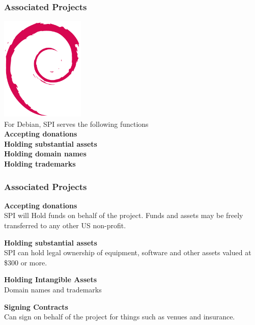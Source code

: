 \documentclass[10pt, compress]{beamer}
\begin{document}
\begin{frame}[fragile]
  \frametitle{Associated Projects}
  \begin{center}
    \includegraphics[width=0.3\textwidth]{images/debian.png}
    \\ \vspace{4mm}
    For Debian, SPI serves the following functions
    \\ \vspace{4mm}
    \textbf{Accepting donations}
    \\
    \textbf{Holding substantial assets}
    \\
    \textbf{Holding domain names}
    \\
    \textbf{Holding trademarks}
    \end{center}
\end{frame}


\begin{frame}[fragile]
  \frametitle{Associated Projects}
    \textbf{Accepting donations}\\
    SPI will Hold funds on behalf of the project. Funds and assets may be freely transferred to any other US non-profit.
    
    \vspace{4mm}
    
    \textbf{Holding substantial assets}\\
    SPI can hold legal ownership of equipment, software and other assets valued at \$300 or more.
    
    \vspace{4mm}
    
    \textbf{Holding Intangible Assets}\\
    Domain names and trademarks
    
    \vspace{4mm}
    
    \textbf{Signing Contracts}\\
    Can sign on behalf of the project for things such as venues and insurance.

\end{frame}
\end{document}
